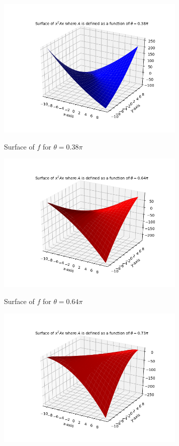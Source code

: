 \documentclass{article}
\begin{document}
\begin{flushleft}
 \begin{figure}[htp]
         \centering
         \includegraphics[width=9cm]{38pi.png}\\
         \caption{Surface of $f$ for $\theta=0.38\pi$}
 \end{figure}
 \begin{figure}[htp]
         \centering
         \includegraphics[width=9cm]{64pi.png}\\
         \caption{Surface of $f$ for $\theta=0.64\pi$}
 \end{figure}
 \begin{figure}[htp]
         \centering
         \includegraphics[width=9cm]{73pi.png}\\

\end{figure}
\end{flushleft}
\end{document}
